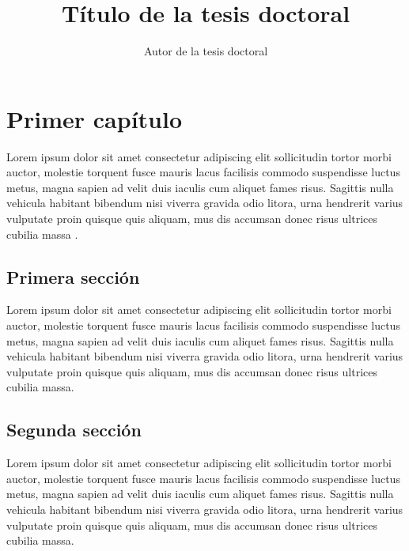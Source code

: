 \documentclass{uathesis-es}
\title{Título de la tesis doctoral}
\author{Autor de la tesis doctoral}
\begin{document}
\maketitle

\tableofcontents



\chapter{Primer capítulo}

Lorem ipsum dolor sit amet consectetur adipiscing elit sollicitudin tortor morbi auctor, molestie torquent fusce mauris lacus facilisis commodo suspendisse luctus metus, magna sapien ad velit duis iaculis cum aliquet fames risus. Sagittis nulla vehicula habitant bibendum nisi viverra gravida odio litora, urna hendrerit varius vulputate proin quisque quis aliquam, mus dis accumsan donec risus ultrices cubilia massa \cite{uathesis-latex}.

\section{Primera sección}

Lorem ipsum dolor sit amet consectetur adipiscing elit sollicitudin tortor morbi auctor, molestie torquent fusce mauris lacus facilisis commodo suspendisse luctus metus, magna sapien ad velit duis iaculis cum aliquet fames risus. Sagittis nulla vehicula habitant bibendum nisi viverra gravida odio litora, urna hendrerit varius vulputate proin quisque quis aliquam, mus dis accumsan donec risus ultrices cubilia massa.

\section{Segunda sección}

Lorem ipsum dolor sit amet consectetur adipiscing elit sollicitudin tortor morbi auctor, molestie torquent fusce mauris lacus facilisis commodo suspendisse luctus metus, magna sapien ad velit duis iaculis cum aliquet fames risus. Sagittis nulla vehicula habitant bibendum nisi viverra gravida odio litora, urna hendrerit varius vulputate proin quisque quis aliquam, mus dis accumsan donec risus ultrices cubilia massa.
\end{document}
